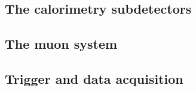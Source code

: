 

\subsection{The calorimetry subdetectors}

\subsection{The muon system}

\subsection{Trigger and data acquisition}
